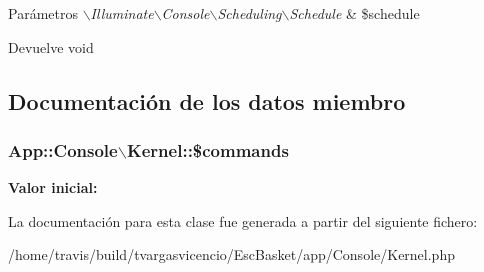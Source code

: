 \begin{DoxyParams}{\-Parámetros}
{\em $\backslash$\-Illuminate$\backslash$\-Console$\backslash$\-Scheduling$\backslash$\-Schedule} & \$schedule \\
\hline
\end{DoxyParams}
\begin{DoxyReturn}{\-Devuelve}
void 
\end{DoxyReturn}


\subsection{\-Documentación de los datos miembro}
\hypertarget{class_app_1_1_console_1_1_kernel_af2cd099c58b15259011f9b9e60601e48}{
\subsubsection[{\$commands}]{\setlength{\rightskip}{0pt plus 5cm}\-App\-::\-Console$\backslash$\-Kernel\-::\$commands}}\label{class_app_1_1_console_1_1_kernel_af2cd099c58b15259011f9b9e60601e48}
{\bfseries \-Valor inicial\-:}
\begin{DoxyCode}
\end{DoxyCode}


\-La documentación para esta clase fue generada a partir del siguiente fichero\-:\begin{DoxyCompactItemize}
\item 
/home/travis/build/tvargasvicencio/\-Esc\-Basket/app/\-Console/\-Kernel.\-php\end{DoxyCompactItemize}
